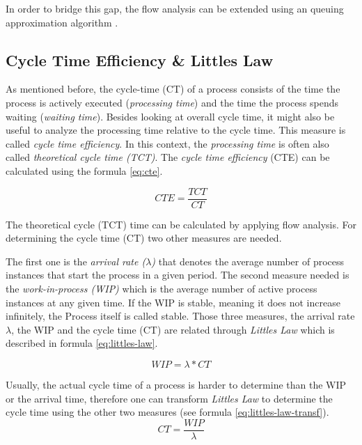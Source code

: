 In order to bridge this gap, the flow analysis can be extended using an queuing approximation algorithm \cite{ha2006approximate}.


\subsection{Cycle Time Efficiency \& Littles Law}
As mentioned before, the \gls{cycle-time} (CT) of a process consists of the time the process is actively executed (\textit{processing time}) and the time the process spends waiting (\textit{waiting time}). Besides looking at overall cycle time, it might also be useful to analyze the processing time relative to the cycle time. This measure is called \textit{cycle time efficiency}. In this context, the \textit{processing time} is often also called \textit{theoretical cycle time (TCT)}. The \textit{cycle time efficiency} (CTE) can be calculated using the formula \ref{eq:cte}.\cite{fundamentals}

\begin{equation}\label{eq:cte}
	CTE = \dfrac{TCT}{CT}
\end{equation}

The theoretical cycle (TCT) time can be calculated by applying flow analysis. For determining the cycle time (CT) two other measures are needed. 

The first one is the \textit{arrival rate ($\lambda$)} that denotes the average number of process instances that start the process in a given period. The second measure needed is the \textit{work-in-process (WIP)} which is the average number of active process instances at any given time. If the WIP is stable, meaning it does not increase infinitely, the Process itself is called stable. Those three measures, the arrival rate $\lambda$, the WIP and the cycle time (CT) are related through \textit{Littles Law} which is described in formula \ref{eq:littles-law}.\cite{little2008little}

\begin{equation}\label{eq:littles-law}
	WIP = \lambda * CT
\end{equation}

Usually, the actual cycle time of a process is harder to determine than the WIP or the arrival time, therefore one can transform \textit{Littles Law} to determine the cycle time using the other two measures (see formula \ref{eq:littles-law-transf}).
\begin{equation}\label{eq:littles-law-transf}
	CT = \dfrac{WIP}{\lambda}
\end{equation}
